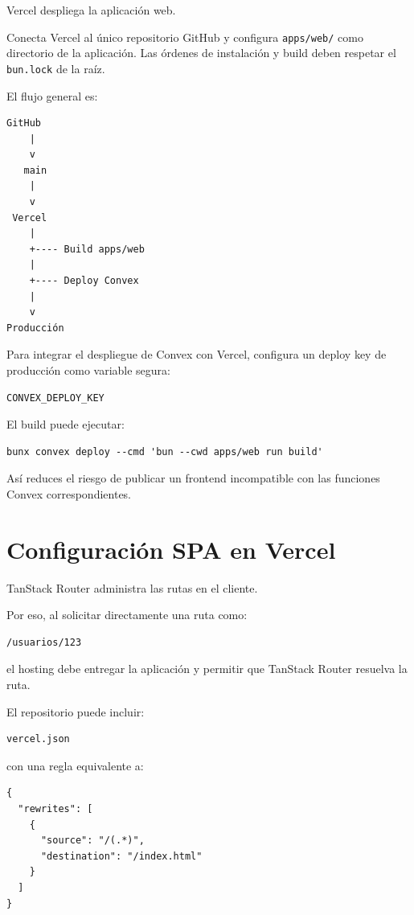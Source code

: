 \documentclass[11pt,a4paper]{article}
\begin{document}
Vercel despliega la aplicación web.

Conecta Vercel al único repositorio GitHub y configura \texttt{apps/web/} como
directorio de la aplicación. Las órdenes de instalación y build deben respetar
el \texttt{bun.lock} de la raíz.

El flujo general es:

\begin{lstlisting}
GitHub
    |
    v
   main
    |
    v
 Vercel
    |
    +---- Build apps/web
    |
    +---- Deploy Convex
    |
    v
Producción
\end{lstlisting}

Para integrar el despliegue de Convex con Vercel, configura un deploy key de
producción como variable segura:

\begin{lstlisting}
CONVEX_DEPLOY_KEY
\end{lstlisting}

El build puede ejecutar:

\begin{lstlisting}
bunx convex deploy --cmd 'bun --cwd apps/web run build'
\end{lstlisting}

Así reduces el riesgo de publicar un frontend incompatible con las funciones
Convex correspondientes.

\section{Configuración SPA en Vercel}

TanStack Router administra las rutas en el cliente.

Por eso, al solicitar directamente una ruta como:

\begin{lstlisting}
/usuarios/123
\end{lstlisting}

el hosting debe entregar la aplicación y permitir que TanStack Router resuelva
la ruta.

El repositorio puede incluir:

\begin{lstlisting}
vercel.json
\end{lstlisting}

con una regla equivalente a:

\begin{lstlisting}
{
  "rewrites": [
    {
      "source": "/(.*)",
      "destination": "/index.html"
    }
  ]
}
\end{lstlisting}
\end{document}
